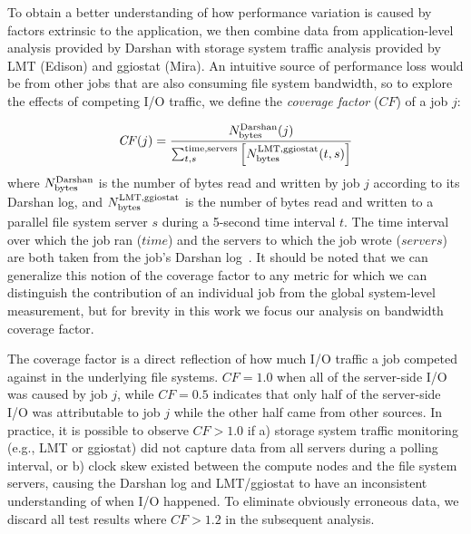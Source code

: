 To obtain a better understanding of how performance variation is caused by factors extrinsic to the application, we then combine data from application-level analysis provided by Darshan with storage system traffic analysis provided by LMT (Edison) and ggiostat (Mira).
An intuitive source of performance loss would be from other jobs that are also consuming file system bandwidth, so to explore the effects of competing I/O traffic, we define the \emph{coverage factor} ($\mathit{CF}$) of a job $j$:

\begin{equation} \label{eq:cf}
    \mathit{CF}(j) = \frac{N_{\textup{bytes}}^{\textup{Darshan}}(j)}
    {\sum_{t,s}^{\textup{time,servers}}
    \left [ N_{\textup{bytes}}^{\textup{LMT,ggiostat}}(t,s) \right ] }
\end{equation}
%
where $N_{\textup{bytes}}^{\textup{Darshan}}$ is the number of bytes read and written by job $j$ according to its Darshan log, and $N_{\textup{bytes}}^{\textup{LMT,ggiostat}}$ is the number of bytes read and written to a parallel file system server $s$ during a 5-second time interval $t$.
The time interval over which the job ran ($\mathit{time}$) and the servers to
which the job wrote ($\mathit{servers}$) are both taken from the job's
Darshan log~\cite{snyder2016modular}.  It should be noted that we can
generalize this notion of the coverage factor to any metric for which we can
distinguish the contribution of an individual job from the global
system-level measurement, but for brevity in this work we focus our analysis
on bandwidth coverage factor.

The coverage factor is a direct reflection of how much I/O traffic a job competed against in the underlying file systems.
$CF = 1.0$ when all of the server-side I/O was caused by job $j$, while $CF = 0.5$ indicates that only half of the server-side I/O was attributable to job $j$ while the other half came from other sources.
In practice, it is possible to observe $CF > 1.0$ if
a) storage system traffic monitoring (e.g., LMT or ggiostat) did not capture data from all servers during a polling interval, or
b) clock skew existed between the compute nodes and the file system servers, causing the Darshan log and LMT/ggiostat to have an inconsistent understanding of when I/O happened.
To eliminate obviously erroneous data, we discard all test results where $CF > 1.2$ in the subsequent analysis.


